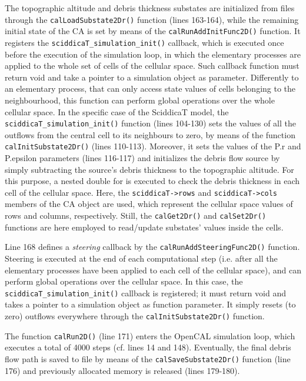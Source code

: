 The topographic altitude and debris thickness substates are
initialized from files through the \verb'calLoadSubstate2Dr()'
function (lines 163-164), while the remaining initial state of the CA
is set by means of the \verb'calRunAddInitFunc2D()' function. It
registers the \verb'sciddicaT_simulation_init()' callback, which is
executed once before the execution of the simulation loop, in which
the elementary processes are applied to the whole set of cells of the
cellular space. Such callback function must return void and take a
pointer to a simulation object as parameter. Differently to an
elementary process, that can only access state values of cells
belonging to the neighbourhood, this function can perform global
operations over the whole cellular space. In the specific case of the
SciddicaT model, the \verb'sciddicaT_simulation_init()' function
(lines 104-130) sets the values of all the outflows from the central
cell to its neighbours to zero, by means of the function
\verb'calInitSubstate2Dr()' (lines 110-113). Moreover, it sets the
values of the P.r and P.epsilon parameters (lines 116-117) and
initializes the debris flow source by simply subtracting the source's
debris thickness to the topographic altitude. For this purpose, a
nested double for is executed to check the debris thickness in each
cell of the cellular space. Here, the \verb'sciddicaT->rows' and
\verb'sciddicaT->cols' members of the CA object are used, which
represent the cellular space values of rows and columns,
respectively. Still, the \verb'calGet2Dr()' and \verb'calSet2Dr()'
functions are here employed to read/update substates' values inside
the cells.

Line 168 defines a \emph{steering} callback by
the \verb'calRunAddSteeringFunc2D()' function. Steering is executed at
the end of each computational step (i.e. after all the elementary
processes have been applied to each cell of the cellular space), and
can perform global operations over the cellular space. In this case,
the \verb'sciddicaT_simulation_init()' callback is registered; it must
return void and takes a pointer to a simulation object as function
parameter. It simply resets (to zero) outflows everywhere through
the \verb'calInitSubstate2Dr()' function.

The function \verb'calRun2D()' (line 171) enters the OpenCAL
simulation loop, which executes a total of 4000 steps (cf. lines 14
and 148). Eventually, the final debris flow path is saved to file by
means of the \verb'calSaveSubstate2Dr()' function (line 176) and
previously allocated memory is released (lines 179-180).

